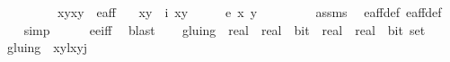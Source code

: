 \begin{isabellebody}
\ \ \ \ \ \ \ \ \ \ {\isachardoublequoteopen}{\isacharparenleft}{\isacharparenleft}x{}{\isacharcomma}y{}{\isacharparenright}{\isacharcomma}{\isacharparenleft}x{}{\isacharcomma}y{}{\isacharparenright}{\isacharparenright}\ {\isasymin}\ e{\isacharunderscore}aff{\isacharunderscore}{}{\isachardoublequoteclose}\isanewline
\ \ \ {\isachardoublequoteopen}{\isacharparenleft}x{}{\isacharcomma}y{}{\isacharparenright}\ {\isacharequal}\ i\ {\isacharparenleft}x{}{\isacharcomma}y{}{\isacharparenright}{\isachardoublequoteclose}\isanewline
%
\isadelimproof
%
\endisadelimproof
%
\isatagproof
{}\isamarkupfalse%
\ {\isacharminus}\isanewline
\ \ \isamarkupfalse%
\ {\isachardoublequoteopen}e\ x{}\ y{}\ {\isacharequal}\ {}{\isachardoublequoteclose}\ \isanewline
\ \ \ \ \isamarkupfalse%
\ assms{\isacharparenleft}{}{\isacharparenright}\ \isamarkupfalse%
\ e{\isacharunderscore}aff{\isacharunderscore}{}{\isacharunderscore}def\ e{\isacharunderscore}aff{\isacharunderscore}def\isanewline
\ \ \ \ \isamarkupfalse%
{\isacharparenleft}simp{\isacharparenright}\isanewline
\ \ \ \ \isamarkupfalse%
\ e{\isacharunderscore}e{\isacharprime}{\isacharunderscore}iff\ \isamarkupfalse%
\ blast\isanewline
\isanewline
\ \ \isamarkupfalse%
%
\endisatagproof
{\isafoldproof}%
%
\isadelimproof
%
\endisadelimproof
%
\isadelimdocument
%
\endisadelimdocument
%
\isatagdocument
%
\isamarkuptrue%
%
\endisatagdocument
{\isafolddocument}%
%
\isadelimdocument
%
\endisadelimdocument
{}\isamarkupfalse%
\ gluing\ {\isacharcolon}{\isacharcolon}\ {\isachardoublequoteopen}{\isacharparenleft}{\isacharparenleft}{\isacharparenleft}real\ {\isasymtimes}\ real{\isacharparenright}\ {\isasymtimes}\ bit{\isacharparenright}\ {\isasymtimes}\ {\isacharparenleft}{\isacharparenleft}real\ {\isasymtimes}\ real{\isacharparenright}\ {\isasymtimes}\ bit{\isacharparenright}{\isacharparenright}\ set{\isachardoublequoteclose}\ \isanewline
\ \ {\isachardoublequoteopen}gluing\ {\isacharequal}\ {\isacharbraceleft}{\isacharparenleft}{\isacharparenleft}{\isacharparenleft}x{}{\isacharcomma}y{}{\isacharparenright}{\isacharcomma}l{\isacharparenright}{\isacharcomma}{\isacharparenleft}{\isacharparenleft}x{}{\isacharcomma}y{}{\isacharparenright}{\isacharcomma}j{\isacharparenright}{\isacharparenright}{\isachardot}\ \isanewline

\end{isabellebody}
